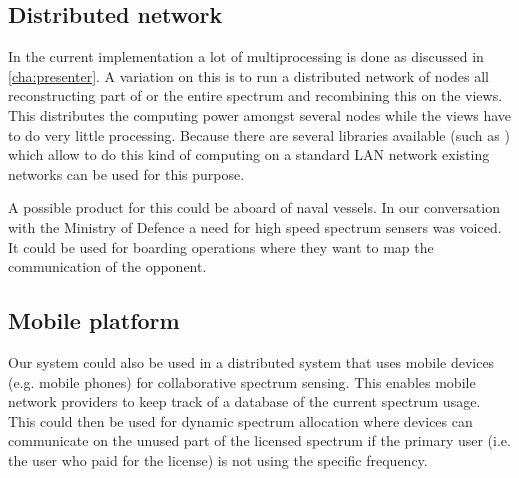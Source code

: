 \documentclass[a4paper, openany, oneside]{memoir}
\begin{document}
\subsection{Distributed network}
\label{sec:distributed}
In the current implementation a lot of multiprocessing is done as discussed in \cref{cha:presenter}. A variation on this is to run a distributed network of nodes all reconstructing part of or the entire spectrum and recombining this on the views. This distributes the computing power amongst several nodes while the views  have to do very little processing. Because there are several libraries available (such as ) which allow to do this kind of computing on a standard LAN network existing networks can be used for this purpose.

A possible product for this could be aboard of naval vessels. In our conversation with the Ministry of Defence a need for high speed spectrum sensers was voiced. It could be used for boarding operations where they want to map the communication of the opponent.

\subsection{Mobile platform}
\label{sub:mobile_platform}
Our system could also be used in a distributed system that uses mobile devices (e.g. mobile phones) for collaborative spectrum sensing. This enables mobile network providers to keep track of a database of the current spectrum usage. This could then be used for dynamic spectrum allocation where devices can communicate on the unused part of the licensed spectrum if the primary user (i.e. the user who paid for the license) is not using the specific frequency.
\end{document}
